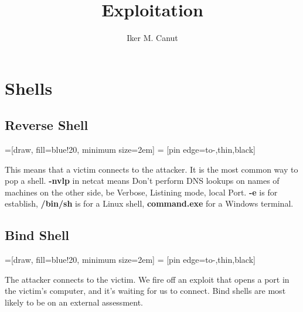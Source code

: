 \documentclass[11pt,a4paper]{article}
\author{Iker M. Canut}
\begin{document}
\title{Exploitation}
\maketitle
\newpage

\section{Shells}
\subsection{Reverse Shell}
\begin{center}
=[draw, fill=blue!20, minimum size=2em]
 = [pin edge={to-,thin,black}]
\end{center}
This means that a victim connects to the attacker. It is the most common way to pop a shell. \textbf{-nvlp} in netcat means Don't perform DNS lookups on names of machines on the other side, be Verbose, Listining mode, local Port. \textbf{-e} is for establish, \textbf{/bin/sh} is for a Linux shell, \textbf{command.exe} for a Windows terminal.

\subsection{Bind Shell}
\begin{center}
=[draw, fill=blue!20, minimum size=2em]
 = [pin edge={to-,thin,black}]
\end{center}
The attacker connects to the victim. We fire off an exploit that opens a port in the victim's computer, and it's waiting for us to connect. Bind shells are most likely to be on an external assessment.
\end{document}
